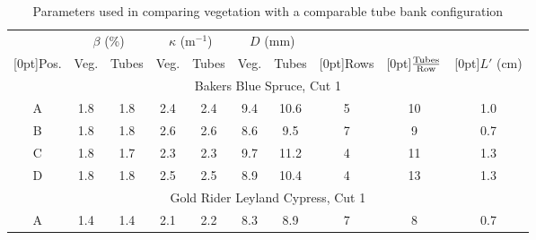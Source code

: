 \documentclass[12pt]{article}
\newcommand*\textfrac[2]{
  \frac{{#1}}{{#2}}
}
\begin{document}
\begin{table}[!]
    \centering
    \caption{Parameters used in comparing vegetation with a comparable tube bank configuration}
    \label{tab:tube_parameters}
    \begin{tabular}{|c|c|c|c|c|c|c|c|c|c|}
    \hline
                                 & \multicolumn{2}{|c|}{$\beta$ (\%)} & \multicolumn{2}{|c|}{$\kappa$ (m$^{-1}$)} & \multicolumn{2}{|c|}{$D$ (mm)} &                             &                         &         \\ \cline{2-7}
    \raisebox{1.5ex}[0pt]{Pos.}  & Veg.             & Tubes      & Veg.                 & Tubes              & Veg.              & Tubes      & \raisebox{1.5ex}[0pt]{Rows} & \raisebox{1.5ex}[0pt]{$\textfrac{\rm{Tubes}}{\rm{Row}}$} &\raisebox{1.5ex}[0pt]{$L'$ (cm)}\\ \hline \hline
    \multicolumn{10}{|c|}{Bakers Blue Spruce, Cut 1}                                                                                                                                                    \\ \hline
    A                            & 1.8            & 1.8      & 2.4                  & 2.4                & 9.4               & 10.6        & 5                           & 10           &          1.0           \\ \hline
    B                            & 1.8            &1.8     & 2.6                & 2.6               &8.6               & 9.5       & 7                           & 9                      &         0.7  \\ \hline
    C                            & 1.8            & 1.7      & 2.3                  & 2.3                & 9.7               & 11.2       &4                            & 11            &      1.3             \\ \hline
    D                            & 1.8           & 1.8      & 2.5                 & 2.5               & 8.9             & 10.4       & 4                           & 13                 &  1.3              \\ \hline
        \multicolumn{10}{|c|}{Gold Rider Leyland Cypress, Cut 1}                                                                                                                                                    \\ \hline
    A                            &1.4           & 1.4      & 2.1                  & 2.2                & 8.3              & 8.9       & 7                           & 8                 &   0.7         \\ \hline

\end{tabular}
\end{table}
\end{document}
